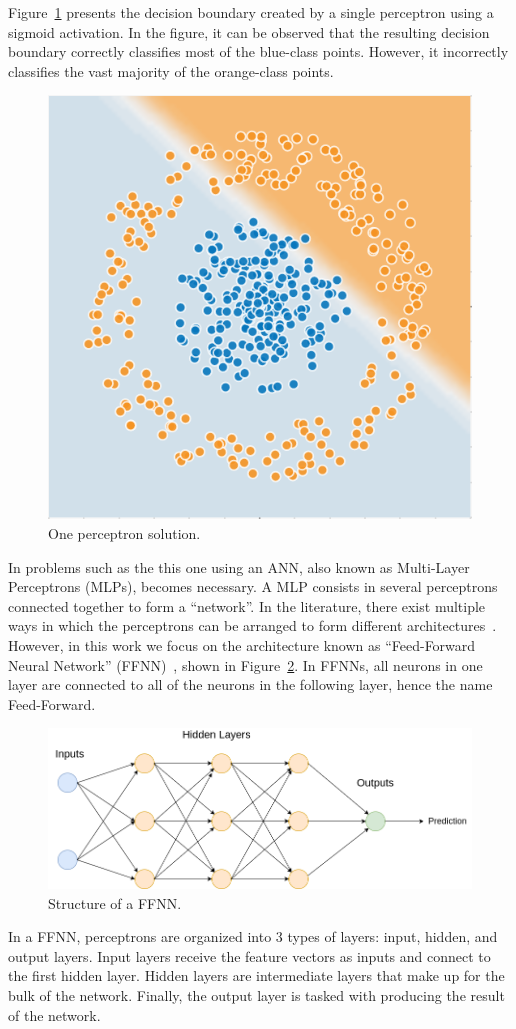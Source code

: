 Figure~\ref{fig:one_perceptron} presents the decision boundary created by a
single perceptron using a sigmoid activation. In the figure, it can be observed
that the resulting decision boundary correctly classifies most of the blue-class
points. However, it incorrectly classifies the vast majority of the orange-class
points.

\begin{figure}[!htbp]
    \centering
    \includegraphics[width=.35\textwidth]{Images/circles_perceptron.png}
    \caption{One perceptron solution.}
    \label{fig:one_perceptron}
\end{figure}

In problems such as the this one using an ANN, also known as Multi-Layer
Perceptrons (MLPs), becomes necessary. A MLP consists in several perceptrons
connected together to form a ``network''. In the literature, there exist
multiple ways in which the perceptrons can be arranged to form different
architectures~\cite{deep_learning_overview}. However, in this work we focus on the architecture known as
``Feed-Forward Neural Network'' (FFNN)~\cite{ffnn}, shown in Figure~\ref{fig:ffnn}. In
FFNNs, all neurons in one layer are connected to all of the neurons in the
following layer, hence the name Feed-Forward.

\begin{figure}[!htbp]
    \centering
    \includegraphics[width=.5\textwidth]{Images/mlp.png}
    \caption{Structure of a FFNN.}
    \label{fig:ffnn}
\end{figure}

In a FFNN, perceptrons are organized into 3 types of layers: input, hidden, and
output layers.  Input layers receive the feature vectors as inputs and connect
to the first hidden layer. Hidden layers are intermediate layers that make up
for the bulk of the network. Finally, the output layer is tasked with producing
the result of the network. 

